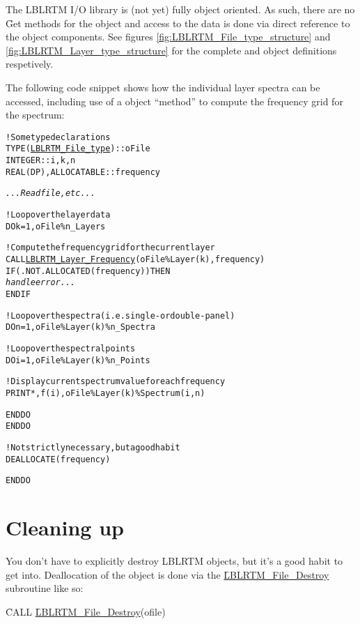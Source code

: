 The LBLRTM I/O library is (not yet) fully object oriented. As such, there are no \f{Get} methods for the \File{} object and access to the data is done via direct reference to the object components. See figures \ref{fig:LBLRTM_File_type_structure} and \ref{fig:LBLRTM_Layer_type_structure} for the complete \File{} and \Layer{} object definitions respetively.

The following code snippet shows how the individual layer spectra can be accessed, including use of a \Layer{} object ``method'' to compute the frequency grid for the spectrum:
\begin{alltt}
  ! Some type declarations
  TYPE(\hyperref[fig:LBLRTM_File_type_structure]{LBLRTM_File_type}) :: oFile
  INTEGER :: i, k, n
  REAL(DP), ALLOCATABLE :: frequency
  
  \textrm{\textit{...Read file, etc...}}
  
  ! Loop over the layer data
  DO k = 1, oFile\%n_Layers
  
    ! Compute the frequency grid for the current layer
    CALL \hyperref[sec:LBLRTM_Layer_Frequency_interface]{LBLRTM_Layer_Frequency}(oFile\%Layer(k), frequency)
    IF ( .NOT. ALLOCATED(frequency) ) THEN
      \textrm{\textit{handle error...}}
    END IF
    
    ! Loop over the spectra (i.e. single- or double-panel)
    DO n = 1, oFile\%Layer(k)\%n_Spectra
    
      ! Loop over the spectral points
      DO i = 1, oFile\%Layer(k)\%n_Points
    
        ! Display current spectrum value for each frequency
        PRINT *, f(i), oFile\%Layer(k)\%Spectrum(i,n)
        
      END DO
    END DO
    
    ! Not strictly necessary, but a good habit
    DEALLOCATE(frequency)
    
  END DO\end{alltt}




\section{Cleaning up}

You don't have to explicitly destroy LBLRTM \File{} objects, but it's a good habit to get into. Deallocation of the \File{} object is done via the \hyperref[sec:LBLRTM_File_Destroy_interface]{\f{LBLRTM\_File\_Destroy}} subroutine like so:

\hspace{0.4cm}\f{CALL }\hyperref[sec:LBLRTM_File_Destroy_interface]{\f{LBLRTM\_File\_Destroy}}(ofile)


